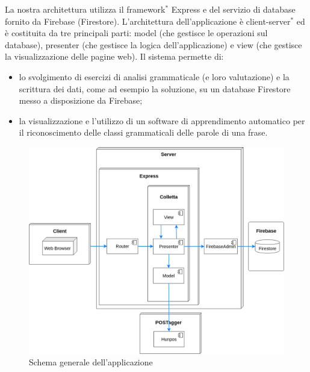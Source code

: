 La nostra architettura utilizza il framework$^{*}$ Express e del servizio di database fornito da Firebase (Firestore). L'architettura dell'applicazione è client-server$^{*}$ ed è costituita da tre principali parti: model (che gestisce le operazioni sul database), presenter (che gestisce la logica dell'applicazione) e view (che gestisce la visualizzazione delle pagine web). Il sistema permette di:
\begin{itemize}
	\item lo svolgimento di esercizi di analisi grammaticale (e loro valutazione) e la scrittura dei dati, come ad esempio la soluzione, su un database Firestore messo a disposizione da Firebase;
	\item la visualizzazione e l'utilizzo di un software di apprendimento automatico per il riconoscimento delle classi grammaticali delle parole di una frase.
\end{itemize}

\begin{figure}[h]
	\includegraphics[scale=0.4]{images/architettura.png}
	\caption{Schema generale dell'applicazione}
\end{figure}

